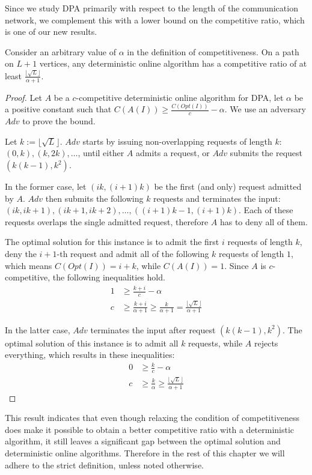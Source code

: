 Since we study DPA primarily with respect to the length of the
communication network, we complement this with a lower bound on the
competitive ratio, which is one of our new results.

\begin{theorem}\label{theorem:relaxed-dpa-deterministic}
    Consider an arbitrary value of $\alpha$ in the definition of
    competitiveness. On a path on $L+1$ vertices, any deterministic online
    algorithm has a competitive ratio of at least
    $\frac{\lfloor\sqrt{L}\rfloor}{\alpha+1}$.
\end{theorem}

\begin{proof}
    Let $A$ be a $c$-competitive deterministic online algorithm for DPA,
    let $\alpha$ be a positive constant such that $C(A(I)) \geq
    \frac{C(Opt(I))}{c} - \alpha$. We use an adversary $Adv$ to prove the
    bound.

    Let $k := \lfloor\sqrt{L}\rfloor$. $Adv$ starts by issuing
    non-overlapping requests of length $k$: $(0, k), (k, 2k), \dots$,
    until either $A$ admits a request, or $Adv$ submits the request
    $(k(k-1), k^2)$.

    In the former case, let $(ik, (i+1)k)$ be the first (and only) request
    admitted by $A$. $Adv$ then submits the following $k$ requests and
    terminates the input: $(ik, ik+1), (ik+1, ik+2), \dots, ((i+1)k-1,
    (i+1)k)$. Each of these requests overlaps the single admitted request,
    therefore $A$ has to deny all of them.

    The optimal solution for this instance is to admit the first $i$
    requests of length $k$, deny the $i+1$-th request and admit all of the
    following $k$ requests of length $1$, which means $C(Opt(I)) = i+k$,
    while $C(A(I)) = 1$. Since $A$ is $c$-competitive, the following
    inequalities hold.
    \begin{align*}
        1 &\geq \frac{k+i}{c} - \alpha \\
        c &\geq \frac{k+i}{\alpha + 1} \geq \frac{k}{\alpha + 1} =
        \frac{\lfloor\sqrt{L}\rfloor}{\alpha + 1}
    \end{align*}

    In the latter case, $Adv$ terminates the input after request $(k(k-1),
    k^2)$. The optimal solution of this instance is to admit all $k$
    requests, while $A$ rejects everything, which results in these
    inequalities:
    \begin{align*}
        0 &\geq \frac{k}{c} - \alpha \\
        c &\geq \frac{k}{\alpha} \geq \frac{\lfloor\sqrt{L}\rfloor}{\alpha + 1}
    \end{align*}
\end{proof}

This result indicates that even though relaxing the condition of
competitiveness does make it possible to obtain a better competitive ratio
with a deterministic algorithm, it still leaves a significant gap between
the optimal solution and deterministic online algorithms. Therefore in the
rest of this chapter we will adhere to the strict definition, unless noted
otherwise.
